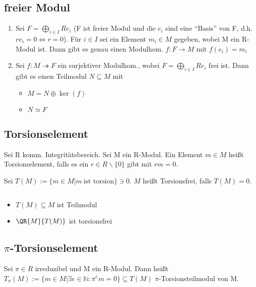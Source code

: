 \subsection{freier Modul}
\begin{theorem}
\leavevmode
\begin{enumerate}
	\item Sei $F = \bigoplus \limits_{i \in I} R e_i $ (F ist freier Modul und die $e_i$ sind eine \enquote{Basis} von F, d.h. $r e_i = 0 \Leftrightarrow r=0$).
	Für $i\in I$ sei ein Element $m_i \in M$ gegeben, wobei M ein R-Modul ist.
	Dann gibt es genau einen Modulhom. $f:F \rightarrow M $ mit $f(e_i) = m_i$
	\item Sei $f:M \twoheadrightarrow F$ ein surjektiver Modulhom., wobei $F = \bigoplus \limits_{i \in I}R e_i$ frei ist. Dann gibt es einen Teilmodul $N \subseteq M$ mit
	\begin{itemize}
		\item $M = N \oplus \ker(f)$
		\item $N \simeq F$
	\end{itemize}
\end{enumerate}
\end{theorem}
\subsection{Torsionselement}
\begin{definition}
Sei R komm. Integritätsbereich. Sei M ein R-Modul. Ein Element $m\in M$ heißt Torsionselement, falls es ein $r\in R \backslash \{0\}$ gibt mit $rm=0$.

Sei $T(M) := \{m \in M | m~\text{ist torsion} \} \ni 0$. $M$ heißt Torsionsfrei, falls $T(M) = 0$.
\end{definition}

\begin{remark}
$~~$
\begin{itemize}
	\item $T(M) \subseteq M$ ist Teilmodul
	\item $\QR{M}{T(M)}$ ist torsionsfrei
\end{itemize}
\end{remark}

\subsection{$\pi$-Torsionselement}
\begin{definition}
Sei $\pi \in R$ irreduzibel und M ein R-Modul. Dann heißt $T_\pi (M):= \{m \in M | \exists e \in \mathbb{N}: \pi^em = 0 \} \subseteq T(M)$ $\pi$-Torsionsteilmodul von M.
\end{definition}

